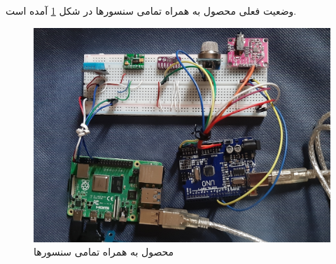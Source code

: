 وضعیت فعلی محصول به همراه تمامی سنسور‌ها در شکل \ref{fig:10} آمده است.


\begin{figure}[h]
	\centering
	\includegraphics[width=1.0\textwidth]{figs/all.jpg}
	
	\caption{محصول به همراه تمامی سنسور‌ها }
	\label{fig:10}
\end{figure}

